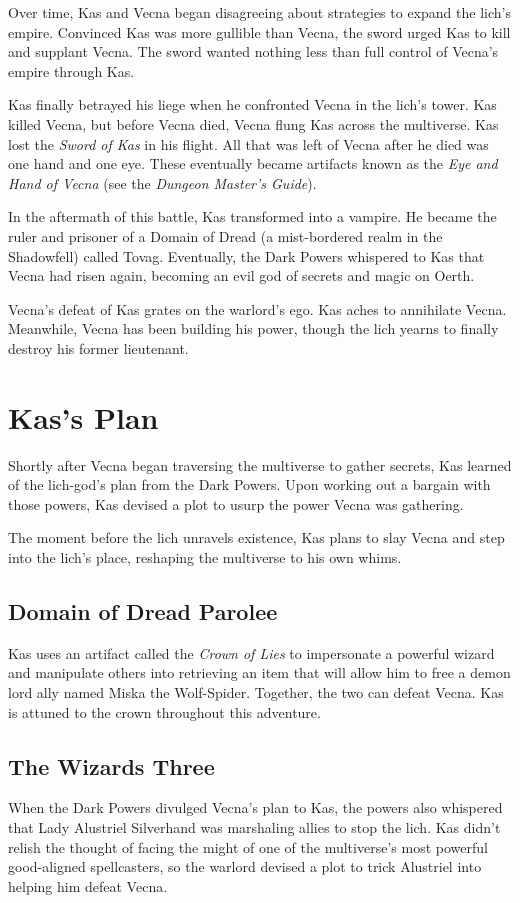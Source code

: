 \documentclass[10pt,a4paper,twoside,bg=print,twocolumn,openany,nodeprecatedcode]{dndbook}
\begin{document}
Over time, Kas and Vecna began disagreeing about strategies to expand the lich's empire. Convinced Kas was more gullible than Vecna, the sword urged Kas to kill and supplant Vecna. The sword wanted nothing less than full control of Vecna's empire through Kas.

Kas finally betrayed his liege when he confronted Vecna in the lich's tower. Kas killed Vecna, but before Vecna died, Vecna flung Kas across the multiverse. Kas lost the \textit{Sword of Kas} in his flight. All that was left of Vecna after he died was one hand and one eye. These eventually became artifacts known as the \textit{Eye and Hand of Vecna} (see the \textit{Dungeon Master's Guide}).

In the aftermath of this battle, Kas transformed into a vampire. He became the ruler and prisoner of a Domain of Dread (a mist-bordered realm in the Shadowfell) called Tovag. Eventually, the Dark Powers whispered to Kas that Vecna had risen again, becoming an evil god of secrets and magic on Oerth.

Vecna's defeat of Kas grates on the warlord's ego. Kas aches to annihilate Vecna. Meanwhile, Vecna has been building his power, though the lich yearns to finally destroy his former lieutenant.

\section{Kas's Plan}
Shortly after Vecna began traversing the multiverse to gather secrets, Kas learned of the lich-god's plan from the Dark Powers. Upon working out a bargain with those powers, Kas devised a plot to usurp the power Vecna was gathering.

The moment before the lich unravels existence, Kas plans to slay Vecna and step into the lich's place, reshaping the multiverse to his own whims.

\subsection{Domain of Dread Parolee}
Kas uses an artifact called the \textit{Crown of Lies} to impersonate a powerful wizard and manipulate others into retrieving an item that will allow him to free a demon lord ally named Miska the Wolf-Spider. Together, the two can defeat Vecna. Kas is attuned to the crown throughout this adventure.

\subsection{The Wizards Three}
When the Dark Powers divulged Vecna's plan to Kas, the powers also whispered that Lady Alustriel Silverhand was marshaling allies to stop the lich. Kas didn't relish the thought of facing the might of one of the multiverse's most powerful good-aligned spellcasters, so the warlord devised a plot to trick Alustriel into helping him defeat Vecna.
\end{document}

